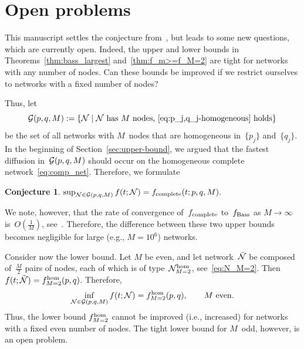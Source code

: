 \documentclass[review]{elsarticle}
\newtheorem{conjecture}{Conjecture}
\begin{document}

\section{Open problems}
  \label{sec:open}
  
This manuscript settles the conjecture from~\cite{OR-10},
 but  leads to some new questions, which are currently open. 
 Indeed, the upper and lower bounds in Theorems~\ref{thm:bass_largest}
 and~\ref{thm:f_m>=f_M=2} are tight for networks with any number of nodes. 
Can these bounds be improved if we restrict ourselves to networks with a fixed number of nodes? 

Thus, let $${\cal G}(p,q,M):=\{{\cal N}  \mid \text{${\cal N}$ has $M$ nodes, \eqref{eq:p_j,q_j-homogeneous} holds} \}$$
 be the set of all networks with $M$~nodes that are homogeneous in~$\{p_j\}$ and~$\{q_j\}$.  In the beginning  of Section~\ref{sec:upper-bound}, we argued that the fastest diffusion in~${\cal G}(p,q,M)$ should occur on the homogeneous complete network~\eqref{eq:comp_net}. Therefore, we formulate 
 \begin{conjecture}
 	\label{conj-ub-M}
 $
\sup_{{\cal N} \in {\cal G}(p,q,M)} f(t;{\cal N})  =   f_{\rm complete}(t;p,q,M).
$ 	
\end{conjecture} 	
We note, however, that the rate of convergence of~$f_{\rm complete}$ to~$f_{\rm Bass}$  as $M \to \infty$ is~$O(\frac1M)$, see~\cite{Bass-compartmental-limits-22}. Therefore, the difference between these two upper bounds becomes negligible for large (e.g., $M = 10^6$) networks.
 
 
 Consider now the lower bound.
 Let $M$ be even, and let network~$\tilde{\cal N}$ be composed of~$\frac{M}{2}$ pairs of nodes, each of which is of type~${\cal N}_{M=2}^{\rm hom}$, see~\eqref{eq:N_M=2}. Then $f(t;\tilde{\cal N}) = f_{M=2}^{\rm hom}(p,q)$. 
Therefore,
$$
\inf_{{\cal N} \in {\cal G}(p,q,M)} f(t;{\cal N})  =  f_{M=2}^{\rm hom}(p,q), 
\qquad \text{$M$ even}.
$$
Thus,  the lower bound $f_{M=2}^{\rm hom}$ cannot be improved 
(i.e., increased) for networks with a fixed even number of nodes.
The tight lower bound for $M$~odd, however, is an open problem. 
\end{document}
